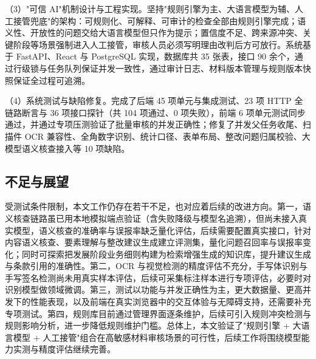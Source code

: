 \documentclass[12pt,a4paper]{ctexart}
\begin{document}
（3）"可信 AI"机制设计与工程实现。坚持"规则引擎为主、大语言模型为辅、人工接管兜底"的架构：可规则化、可解释、可审计的检查全部由规则引擎完成；语义性、开放性的问题交给大语言模型但只作为提示；置信度不足、跨来源冲突、关键阶段等场景强制进入人工接管，审核人员必须写明理由改判后方可放行。系统基于 FastAPI、React 与 PostgreSQL 实现，数据库共 35 张表，接口 90 余个，通过行级锁与任务队列保证并发一致性，通过审计日志、材料版本管理与规则版本快照保证全过程可追溯。

（4）系统测试与缺陷修复。完成了后端 45 项单元与集成测试、23 项 HTTP 全链路断言与 36 项接口探针（共 104 项通过、0 项失败），前端 6 项单元测试同步通过，并通过专项压测验证了批量审核的并发正确性；修复了并发父任务收尾、扫描件 OCR 兼容性、全角数字识别、统计口径、表单布局、整改问题归属校验、大模型语义核查接入等 10 项缺陷。

\subsection{不足与展望}

受测试条件限制，本文工作仍存在若干不足，也对应着后续的改进方向。第一，语义核查链路虽已用本地模拟端点验证（含失败降级与模型名追溯），但尚未接入真实模型，语义核查的准确率与误报率缺乏量化评估，后续需要配置真实接口，针对内容语义核查、要素理解与整改建议生成建立评测集，量化问题召回率与误报率变化；同时可探索把发展阶段业务细则构建为检索增强生成的知识库，提升建议生成与条款引用的准确性。第二，OCR 与视觉检测的精度评估不充分，手写体识别与手写签名检测尚未用真实样本评估，后续可采集标注样本进行专项评估，必要时对识别模型做领域微调。第三，测试以功能与并发正确性为主，更大数据量、更高并发下的性能表现，以及前端在真实浏览器中的交互体验与无障碍支持，还需要补充专项测试。第四，规则库目前通过管理界面逐条维护，后续可引入规则冲突检测与规则影响分析，进一步降低规则维护门槛。总体上，本文验证了"规则引擎 + 大语言模型 + 人工接管"组合在高敏感材料审核场景的可行性，后续工作将围绕模型能力实测与精度评估继续完善。

\clearpage
\end{document}
